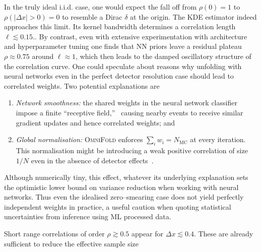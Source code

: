 \begin{description}
                In the truly ideal i.i.d. case, one would expect the fall off from $\rho(0)=1$ to $\rho(|\Delta  x|>0) = 0$ to resemble a Dirac $\delta$ at the origin.
                The {KDE} estimator indeed approaches this limit.
                Its kernel bandwidth determines a correlation length \(\ell \lesssim\!0.15\).\cite{2006AllStatistics, wand_kernel_1994}.
                By contrast, even with extensive experimentation with architecture and hyperparameter tuning one finds that {NN} priors leave a residual plateau $\rho\approx0.75$ around $\ell\approx1$, which then leads to the damped oscillatory structure of the correlation curve.
                One could speculate about reasons why unfolding with neural networks even in the perfect detector resolution case should lead to correlated weights.
                Two potential explanations are
                \begin{enumerate}
                    \item \emph{Network smoothness:} the shared weights in the neural network classifier impose a finite ``receptive field,''~\cite{miller_information-theoretic_1995, djolonga_robustness_2021, saratchandran_weight_2024} causing nearby events to receive similar gradient updates and hence correlated weights; and
                    \item \emph{Global normalisation:} \textsc{OmniFold} enforces $\sum_i w_i = N_{\text{MC}}$ at every iteration.
                    This normalisation might be introducing a weak positive correlation of size $1/N$ even in the absence of detector effects~\cite{cowan_highlights_2011,1937PropertiesTests}.
                \end{enumerate}
                Although numerically tiny, this effect, whatever its underlying explanation sets the optimistic lower bound on variance reduction when working with neural networks.
                Thus even the idealised zero--smearing case does not yield perfectly independent weights in practice, a useful caution when quoting statistical uncertainties from inference using ML processed data.
            \item[Mild smearing (\(\sigma_{\det}=0.25\)):]
                Short range correlations of order \(\rho\gtrsim 0.5\) appear for \(\Delta x\lesssim0.4\).
                These are already sufficient to reduce the {effective sample size}
                \[
\]
\end{description}
